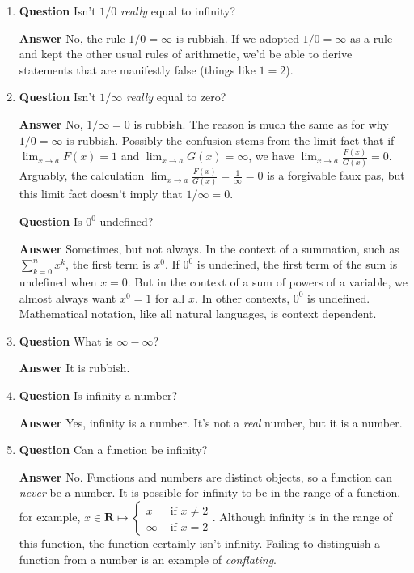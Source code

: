 \documentclass[12pt]{article}
\newcommand{\reals}{\mathbf{R}}
\newcounter{ex}\setcounter{ex}{0}
\begin{document}
\begin{enumerate}
\item  \textbf{Question} Isn't \(1/0\) \emph{really} equal to infinity?

  \textbf{Answer}  No,  the rule  \(1/0 = \infty\)  is rubbish. If we adopted    \(1/0 = \infty\) as a rule and kept the other usual rules of arithmetic, we'd be able to derive statements that
are manifestly false (things like \(1 = 2\)).


\item  \textbf{Question} Isn't \(1/\infty \) \emph{really} equal to zero?

 \textbf{Answer}  No,  \(1/\infty = 0\)  is rubbish.  The reason is much the same as for why  \(1/0 = \infty\)  is rubbish.  Possibly the confusion stems from the limit fact that if \(\displaystyle \lim_{x \to a} F(x) = 1\) and  \(\displaystyle  \lim_{x \to a} G(x) =  \infty\), we have \(\displaystyle \lim_{x \to a} \frac{F(x)}{G(x)} = 0\).  Arguably, the calculation \(\displaystyle \lim_{x \to a} \frac{F(x)}{G(x)} =\frac{1}{\infty} = 0\) is a forgivable faux pas, but this limit fact  doesn't imply that  \(1/\infty = 0\).


\textbf{Question} Is \(0^0\) undefined?

 \textbf{Answer} Sometimes, but not always.  In the context of a summation, such as \(\sum_{k=0}^{n} x^k\),  the first term is \(x^0\). If \(0^0\) is undefined, the first term of the sum is
undefined when \(x=0\). But in the context of a sum of powers of a variable, we almost always want \(x^0 = 1\) for all \(x\).  In other contexts,  \(0^0\) is undefined. Mathematical notation, like all natural languages, is context dependent.

\item  \textbf{Question} What is  \(\infty - \infty\)?

\textbf{Answer} It is rubbish.


\item  \textbf{Question}  Is infinity a number?

\textbf{Answer} Yes, infinity is a number.  It's not a \emph{real} number, but it is a number.

\item  \textbf{Question}  Can a function be infinity?

 \textbf{Answer} No. Functions and numbers are distinct objects, so a function can \emph{never} be a number. It is possible for infinity to be in the range of a function, for example, \(x \in \reals \mapsto \begin{cases}  x & \mbox{ if } x \neq 2 \\ \infty &  \mbox{ if } x = 2 \end{cases} \).  Although infinity is in the range of this function, the function certainly isn't infinity. Failing to distinguish a function from a number is an example of \emph{conflating}.




\end{enumerate}
\end{document}
